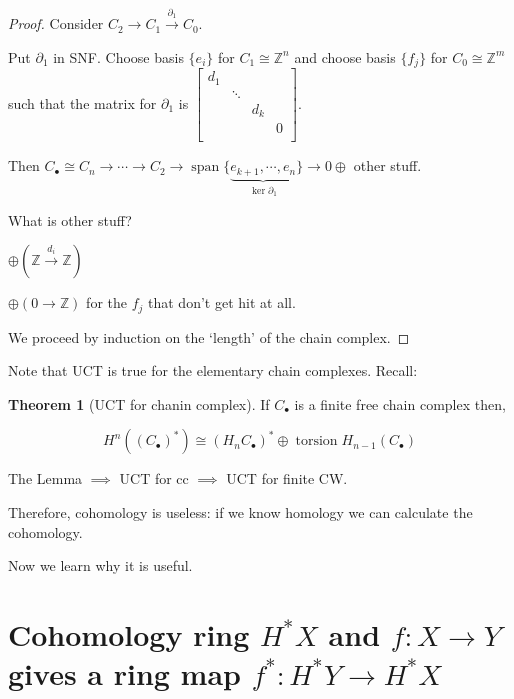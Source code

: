 \documentclass{article}
\theoremstyle{definition}
\newtheorem{theorem}{Theorem}
\begin{document}
    \begin{proof}
        Consider \(C_2 \to C_1 \xrightarrow{\partial_1} C_0\).

        Put \(\partial_1\) in SNF. Choose basis \(\{ e_i \}\) for \(C_1 \cong \mathbb{Z}^n\) and choose basis \(\{ f_j \}\) for \(C_0 \cong \mathbb{Z}^m\) such that the matrix for \(\partial_1\) is \(\begin{bmatrix}
            d_1 &  &  &  \\
             & \ddots &  &  \\
             &  & d_k &  \\
             &  &  & 0 \\
        \end{bmatrix} \). 
        
        Then \(C_\bullet \cong C_n \to \cdots \to C_2 \to \operatorname{span}\{ \underbrace{e_{k+1}, \cdots , e_n}_{\ker \partial_1} \} \to 0 \oplus\) other stuff.
        
        What is other stuff?

        \(\oplus (\mathbb{Z} \xrightarrow{d_i} \mathbb{Z})\)
        
        \(\oplus (0 \to \mathbb{Z})\) for the \(f_j\) that don't get hit at all.

        We proceed by induction on the `length' of the chain complex.
    \end{proof}

    Note that UCT is true for the elementary chain complexes. Recall:


    \begin{theorem}
        [UCT for chanin complex] If \(C_\bullet\) is a finite free chain complex then,

        \[
            H^n((C_\bullet)^{\ast}) \cong (H_n C_\bullet)^{\ast} \oplus \operatorname{torsion} H_{n-1} (C_\bullet)
        \]
    \end{theorem}

    The Lemma \(\implies\) UCT for cc \(\implies\) UCT for finite CW.

    Therefore, cohomology is useless: if we know homology we can calculate the cohomology.

    Now we learn why it is useful.

    \section*{Cohomology ring \(H^{\ast} X\) and \(f:X \to Y\) gives a ring map \(f^{\ast}: H^{\ast} Y \to H^{\ast} X\)}
\end{document}
